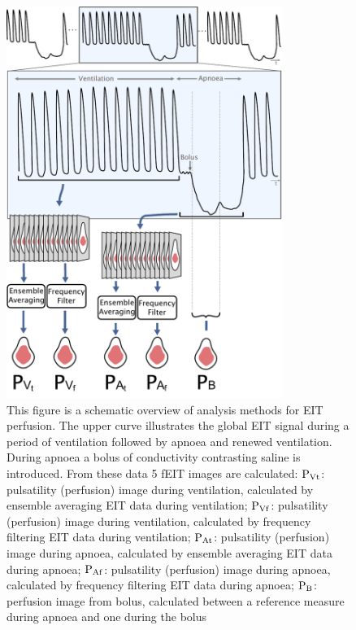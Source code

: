 \begin{figure}
\begin{flushright}
\includegraphics[width=0.8\textwidth]{chapter_2/imgs/fig-methodsOverview.pdf}
\end{flushright}
\caption[Overview of the EIT analysis methods]{\label{fig:methods}%
This figure is a schematic overview of analysis methods for EIT perfusion. 
The upper
curve illustrates the global EIT signal during a period of ventilation
followed by apnoea and renewed ventilation. During apnoea a bolus
of conductivity contrasting saline is introduced. From these data
5 fEIT images are calculated:
${\rm P_{Vt}}$: pulsatility (perfusion) image during ventilation, calculated
by ensemble averaging EIT data during ventilation;
${\rm P_{Vf}}$: pulsatility (perfusion) image during ventilation, calculated
by frequency filtering EIT data during ventilation;
${\rm P_{At}}$: pulsatility (perfusion) image during apnoea, calculated
by ensemble averaging EIT data during apnoea;
${\rm P_{Af}}$: pulsatility (perfusion) image during apnoea, calculated
by frequency filtering EIT data during apnoea;
${\rm P_{B}}$: perfusion image from bolus, calculated between a 
reference measure during apnoea and one during the bolus}
\end{figure}

